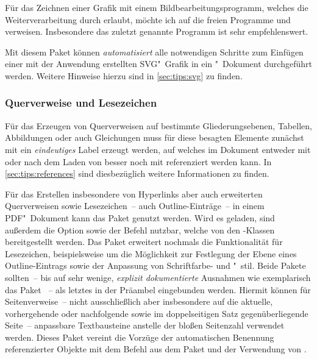 Für das Zeichnen einer Grafik mit einem Bildbearbeitungsprogramm, welches die 
Weiterverarbeitung durch  erlaubt, möchte ich auf die freien 
Programme  und  verweisen. 
Insbesondere das zuletzt genannte Programm ist sehr empfehlenswert. 
%
\begin{DeclarePackages}
  Mit diesem Paket können \emph{automatisiert} alle notwendigen Schritte zum 
  Einfügen einer mit der Anwendung  erstellten 
  SVG"~Grafik in ein "~Dokument durchgeführt werden. Weitere 
  Hinweise hierzu sind in \autoref{sec:tips:svg} zu finden.
\end{DeclarePackages}
%



\subsubsection{%
  Querverweise und Lesezeichen%
}
%
Für das Erzeugen von Querverweisen auf bestimmte Gliederungsebenen, Tabellen, 
Abbildungen oder auch Gleichungen muss für diese besagten Elemente zunächst mit 
 ein \emph{eindeutiges} Label erzeugt werden, auf 
welches im Dokument entweder mit  oder nach dem Laden von 
 besser noch mit  referenziert werden kann. In 
\autoref{sec:tips:references} sind diesbezüglich weitere Informationen zu 
finden.
%
\begin{DeclarePackages}
  Für das Erstellen insbesondere von Hyperlinks aber auch erweiterten 
  Querverweisen sowie Lesezeichen~-- auch Outline-Einträge~-- in einem 
  PDF"~Dokument kann das Paket  genutzt werden. Wird 
  es geladen, sind außerdem die Option  sowie der Befehl 
   nutzbar, welche von den \TUDScript-Klassen bereitgestellt 
  werden. Das Paket  erweitert nochmals die Funktionalität 
  für Lesezeichen, beispielsweise um die Möglichkeit zur Festlegung der Ebene 
  eines Outline-Eintrags sowie der Anpassung von Schriftfarbe- und "~stil.
  Beide Pakete sollten~-- bis auf sehr wenige, \emph{explizit dokumentierte} 
  Ausnahmen wie exemplarisch das Paket ~-- als letztes in 
  der Präambel eingebunden werden.
  Hiermit können für Seitenverweise~-- nicht ausschließlich aber insbesondere 
  auf die aktuelle, vorhergehende oder nachfolgende sowie im doppelseitigen 
  Satz gegenüberliegende Seite~-- anpassbare Textbausteine anstelle der bloßen 
  Seitenzahl verwendet werden.
  Dieses Paket vereint die Vorzüge der automatischen Benennung referenzierter 
  Objekte mit dem Befehl  aus dem Paket  und 
  der Verwendung von .
\end{DeclarePackages}
%
%



